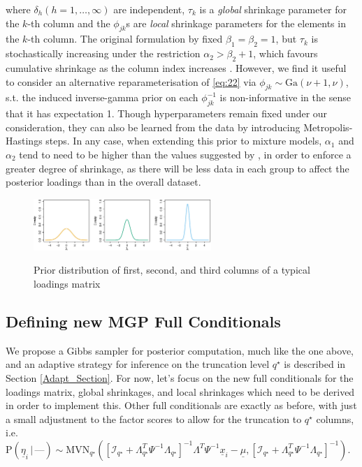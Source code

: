 \documentclass[a4paper,12pt,fleqn]{article}
\numberwithin{equation}{section}
\def\given{\,|\,}
\begin{document}
\noindent where $\delta_h \left(h=1,\ldots,\infty\right)$ are independent, $\tau_k$ is a \textit{global} shrinkage parameter for the $k$-th column and the $\phi_{jk}$s are \textit{local} shrinkage parameters for the elements in the $k$-th column. The original formulation by \citet{Bhattacharya2011} fixed $\beta_1 = \beta_2 = 1$, but $\tau_k$ is stochastically increasing under the restriction $\alpha_2 > \beta_2 + 1$, which favours cumulative shrinkage as the column index increases \citep{Durante2016}. However, we find it useful to consider an alternative reparameterisation of \eqref{eq:22} via $\phi_{jk}\sim\textrm{Ga}\left(\nu + 1, \nu\right)$, s.t. the induced inverse-gamma prior on each $\phi_{jk}^{-1}$ is non-informative in the sense that it has expectation 1. Though hyperparameters remain fixed under our consideration, they can also be learned from the data by introducing Metropolis-Hastings steps. In any case, when extending this prior to mixture models, $\alpha_1$ and $\alpha_2$ tend to need to be higher than the values suggested by \citet{Bhattacharya2011}, in order to enforce a greater degree of shrinkage, as there will be less data in each group to affect the posterior loadings than in the overall dataset.

\begin{figure}[h]
	\centering
	\caption{Prior distribution of first, second, and third columns of a typical loadings matrix}
	\includegraphics[width=0.6\textwidth, keepaspectratio]{Priors}
	\label{PriorPlot}
\end{figure}

\subsection[Defining new MGP Full Conditionals]{Defining new MGP Full Conditionals}
We propose a Gibbs sampler for posterior computation, much like the one above, and an adaptive strategy for inference on the truncation level $q^\star$ is described in Section \ref{Adapt_Section}. For now, let's focus on the new full conditionals for the loadings matrix, global shrinkages, and local shrinkages which need to be derived in order to implement this. Other full conditionals are exactly as before, with just a small adjustment to the factor scores to allow for the truncation to $q^\star$ columns, i.e. $\mathrm{P}\left(\underline{\eta}_i \given \mbox{---}\right) \sim  \textrm{MVN}_{q^\star}\left(\left[\mathcal{I}_{q^\star} + \Lambda^T_{q^\star}\Psi^{-1}\Lambda_{q^\star}\right]^{-1}\Lambda^T\Psi^{-1}\underline{x}_i - \underline{\mu},\left[\mathcal{I}_{q^\star} + \Lambda^T_{q^\star}\Psi^{-1}\Lambda_{q^\star}\right]^{-1}\right)$.
\end{document}
